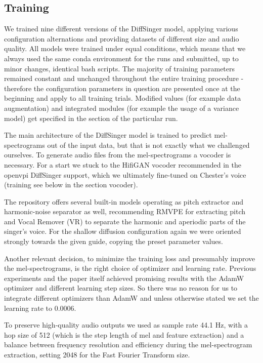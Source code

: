 \documentclass[a4paper]{article}
\begin{document}
	\subsection{Training}
	
	We trained nine different versions of the DiffSinger model, applying various configuration alternations and providing datasets of different size and audio quality. All models were trained under equal conditions, which means that we always used the same conda environment for the runs and submitted, up to minor changes, identical bash scripts. The majority of training parameters remained constant and unchanged throughout the entire training procedure - therefore the configuration parameters in question are presented once at the beginning and apply to all training trials. Modified values (for example data augmentation) and integrated modules (for example the usage of a variance model) get specified in the section of the particular run. 
	
	The main architecture of the DiffSinger model is trained to predict mel-spectrograms out of the input data, but that is not exactly what we challenged ourselves. To generate audio files from the mel-spectrograms a vocoder is necessary. For a start we stuck to the HifiGAN vocoder recommended in the openvpi DiffSinger support, which we ultimately fine-tuned on Chester’s voice (training see below in the section vocoder). 
	
	The repository offers several built-in models operating as pitch extractor and harmonic-noise separator as well, recommending RMVPE for extracting pitch and Vocal Remover (VR) to separate the harmonic and aperiodic parts of the singer's voice. For the shallow diffusion configuration again we were oriented strongly towards the given guide, copying the preset parameter values. 
	
	Another relevant decision, to minimize the training loss and presumably improve the mel-spectrograms, is the right choice of optimizer and learning rate. Previous experiments and the paper itself achieved promising results with the AdamW optimizer and different learning step sizes. So there was no reason for us to integrate different optimizers than AdamW and unless otherwise stated we set the learning rate to 0.0006. 
	
	To preserve high-quality audio outputs we used as sample rate 44.1 Hz, with a hop size of 512 (which is the step length of mel and feature extraction) and a balance between frequency resolution and efficiency during the mel-spectrogram extraction, setting 2048 for the Fast Fourier Transform size.
	
\end{document}
